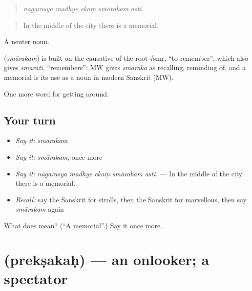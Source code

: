 \begin{quote}
    
\end{quote}

\begin{quote}
\emph{nagarasya madhye ekaṃ smārakam asti.}
\end{quote}

\begin{quote}
In the middle of the city there is a memorial.
\end{quote}

A neuter noun.

\begin{cousinweb}
\textbf{} (\emph{smārakam}) is built on the causative of the root √smṛ, \textquotedblleft{}to remember\textquotedblright{}, which also gives \emph{smarati}, \textquotedblleft{}remembers\textquotedblright{}: MW gives \emph{smāraka} as recalling, reminding of, and a memorial is its use as a noun in modern Sanskrit (MW).
\end{cousinweb}

\begin{grammarlens}[title={What you've built}]
One more word for getting around.
\end{grammarlens}

\subsection*{Your turn}
\begin{itemize}
\raggedright
  \item \emph{Say it:} \emph{smārakam}
  \item \emph{Say it:} \emph{smārakam}, once more
  \item \emph{Say it:} \emph{nagarasya madhye ekaṃ smārakam asti.} — In the middle of the city there is a memorial.
  \item \emph{Recall:} say the Sanskrit for strolls, then the Sanskrit for marvellous, then say \emph{smārakam} again
\end{itemize}

\begin{tcolorbox}[breakable,colback=teal!4,colframe=teal!35!black,title={Before you move on}]
What does  mean? (\textquotedblleft{}A memorial\textquotedblright{}.) Say it once more.
\end{tcolorbox}
\section[\texorpdfstring{\sk{प्रेक्षकः} (prekṣakaḥ)}{प्रेक्षकः (prekṣakaḥ)}]{ (prekṣakaḥ) — an onlooker; a spectator}

